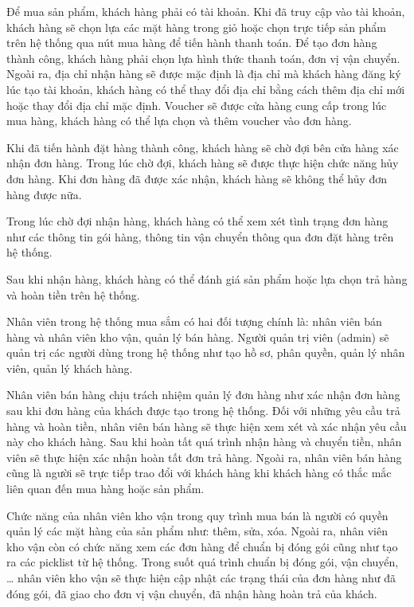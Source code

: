 \documentclass[12pt,a4paper,2sides]{report}
\begin{document}
Để mua sản phẩm, khách hàng phải có tài khoản. Khi đã truy cập vào tài khoản, khách hàng sẽ chọn lựa các mặt hàng trong giỏ hoặc chọn trực tiếp sản phẩm trên hệ thống qua nút mua hàng để tiến hành thanh toán. Để tạo đơn hàng thành công, khách hàng phải chọn lựa hình thức thanh toán, đơn vị vận chuyển. Ngoài ra, địa chỉ nhận hàng sẽ được mặc định là địa chỉ mà khách hàng đăng ký lúc tạo tài khoản, khách hàng có thể thay đổi địa chỉ bằng cách thêm địa chỉ mới hoặc thay đổi địa chỉ mặc định. Voucher sẽ được cửa hàng cung cấp trong lúc mua hàng, khách hàng có thể lựa chọn và thêm voucher vào đơn hàng.

Khi đã tiến hành đặt hàng thành công, khách hàng sẽ chờ đợi bên cửa hàng xác nhận đơn hàng. Trong lúc chờ đợi, khách hàng sẽ được thực hiện chức năng hủy đơn hàng. Khi đơn hàng đã được xác nhận, khách hàng sẽ không thể hủy đơn hàng được nữa.

Trong lúc chờ đợi nhận hàng, khách hàng có thể xem xét tình trạng đơn hàng như các thông tin gói hàng, thông tin vận chuyển thông qua đơn đặt hàng trên hệ thống.

Sau khi nhận hàng, khách hàng có thể đánh giá sản phẩm hoặc lựa chọn trả hàng và hoàn tiền trên hệ thống.

Nhân viên trong hệ thống mua sắm có hai đối tượng chính là: nhân viên bán hàng và nhân viên kho vận, quản lý bán hàng. Người quản trị viên (admin) sẽ quản trị các người dùng trong hệ thống như tạo hồ sơ, phân quyền, quản lý nhân viên, quản lý khách hàng.

Nhân viên bán hàng chịu trách nhiệm quản lý đơn hàng như xác nhận đơn hàng sau khi đơn hàng của khách được tạo trong hệ thống. Đối với những yêu cầu trả hàng và hoàn tiền, nhân viên bán hàng sẽ thực hiện xem xét và xác nhận yêu cầu này cho khách hàng. Sau khi hoàn tất quá trình nhận hàng và chuyển tiền, nhân viên sẽ thực hiện xác nhận hoàn tất đơn trả hàng. Ngoài ra, nhân viên bán hàng cũng là người sẽ trực tiếp trao đổi với khách hàng khi khách hàng có thắc mắc liên quan đến mua hàng hoặc sản phẩm.

Chức năng của nhân viên kho vận trong quy trình mua bán là người có quyền quản lý các mặt hàng của sản phẩm như: thêm, sửa, xóa. Ngoài ra, nhân viên kho vận còn có chức năng xem các đơn hàng để chuẩn bị đóng gói cũng như tạo ra các picklist từ hệ thống. Trong suốt quá trình chuẩn bị đóng gói, vận chuyển, … nhân viên kho vận sẽ thực hiện cập nhật các trạng thái của đơn hàng như đã đóng gói, đã giao cho đơn vị vận chuyển, đã nhận hàng hoàn trả của khách.
\end{document}
